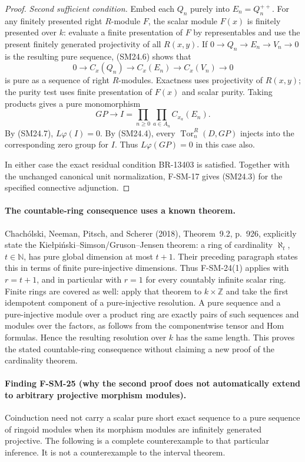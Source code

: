 \documentclass[11pt,a4paper]{article}
\theoremstyle{definition}\newtheorem{definition}[theorem]{Definition}
\theoremstyle{remark}\newtheorem{remark}[theorem]{Remark}
\begin{document}
\begin{proof}
\emph{Second sufficient condition.}
Embed each $Q_n$ purely into $E_n=Q_n^{++}$.
For any finitely presented right $R$-module $F$, the scalar
module $F(x)$ is finitely presented over $k$: evaluate a finite
presentation of $F$ by representables and use the present
finitely generated projectivity of all $R(x,y)$.
If $0\to Q_n\to E_n\to V_n\to0$ is the resulting pure sequence,
(SM24.6) shows that
\[
 0\to C_x(Q_n)\to C_x(E_n)\to C_x(V_n)\to0
\]
is pure as a sequence of right $R$-modules. Exactness uses
projectivity of $R(x,y)$; the purity test uses finite presentation
of $F(x)$ and scalar purity.
Taking products gives a pure monomorphism
\[
 GP\longrightarrow I=
       \prod_{n\geq0}\prod_{a\in A_n}C_{x_a}(E_n).
\]
By (SM24.7), $L\varphi(I)=0$.
By (SM24.4), every $\operatorname{Tor}_n^R(D,GP)$ injects
into the corresponding zero group for $I$.
Thus $L\varphi(GP)=0$ in this case also.

In either case the exact residual condition BR-13403 is satisfied.
Together with the unchanged canonical unit normalization,
F-SM-17 gives (SM24.3) for the specified connective adjunction.
\end{proof}

\paragraph{The countable-ring consequence uses a known theorem.}
Chach\'olski, Neeman, Pitsch, and Scherer (2018),
Theorem~9.2, p.~926, explicitly state the
Kie{\l}pi\'nski--Simson/Gruson--Jensen theorem:
a ring of cardinality $\aleph_t$, $t\in\mathbb N$, has pure
global dimension at most $t+1$. Their preceding paragraph
states this in terms of finite pure-injective dimensions.
Thus F-SM-24(1) applies with $r=t+1$, and in particular with
$r=1$ for every countably infinite scalar ring.
Finite rings are covered as well: apply that theorem to
$k\times\mathbb Z$ and take the first idempotent component of
a pure-injective resolution. A pure sequence and a pure-injective
module over a product ring are exactly pairs of such sequences
and modules over the factors, as follows from the componentwise
tensor and Hom formulas. Hence the resulting resolution over
$k$ has the same length. This proves the stated countable-ring
consequence without claiming a new proof of the cardinality theorem.

\paragraph{Finding F-SM-25 (why the second proof does not automatically extend to arbitrary projective morphism modules).}
Coinduction need not carry a scalar pure short exact sequence to a
pure sequence of ringoid modules when its morphism modules are
infinitely generated projective. The following is a complete
counterexample to that particular inference. It is not a
counterexample to the interval theorem.
\end{document}
